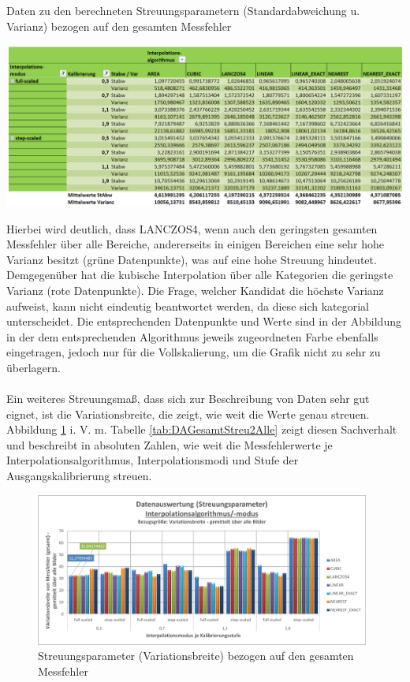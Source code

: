 \documentclass[
fontsize=10pt, 
listof = totoc,
parskip = half	
]{report}
\begin{document}
\begin{table}[H]
	\centering
	\caption{Daten zu den berechneten Streuungsparametern (Standardabweichung u. Varianz) bezogen auf den gesamten Messfehler}
	\label{tab:DAGesamtStreu1Alle}
	\includegraphics[width=\textwidth,height=\textheight,keepaspectratio]{pics/Tab_DA_Gesamt_Streu1_Alle}
\end{table}

\noindent Hierbei wird deutlich, dass LANCZOS4, wenn auch den geringsten gesamten Messfehler über alle Bereiche, andererseits in einigen Bereichen eine sehr hohe Varianz besitzt (grüne Datenpunkte), was auf eine hohe Streuung hindeutet. Demgegenüber hat die kubische Interpolation über alle Kategorien die geringste Varianz (rote Datenpunkte). Die Frage, welcher Kandidat die höchste Varianz aufweist, kann nicht eindeutig beantwortet werden, da diese sich kategorial unterscheidet. Die entsprechenden Datenpunkte und Werte sind in der Abbildung in der dem entsprechenden Algorithmus jeweils zugeordneten Farbe ebenfalls eingetragen, jedoch nur für die Vollskalierung, um die Grafik nicht zu sehr zu überlagern. 
\\\\
Ein weiteres Streuungsmaß, dass sich zur Beschreibung von Daten sehr gut eignet, ist die Variationsbreite, die zeigt, wie weit die Werte genau streuen. Abbildung \ref{fig:DAGesamtStreu2Alle} i. V. m. Tabelle \ref{tab:DAGesamtStreu2Alle} zeigt diesen Sachverhalt und beschreibt in absoluten Zahlen, wie weit die Messfehlerwerte je Interpolationsalgorithmus, Interpolationsmodi und Stufe der Ausgangskalibrierung streuen. 

\begin{figure}[H]
	\centering
	\includegraphics[width=11cm, height=\textheight, keepaspectratio]{pics/DA_Gesamt_Streu2_Alle}
	\caption{Streuungsparameter (Variationsbreite) bezogen auf den gesamten Messfehler}
	\label{fig:DAGesamtStreu2Alle}
\end{figure}
\end{document}
